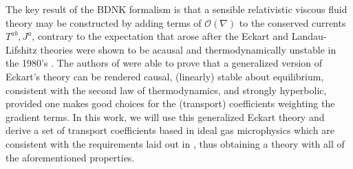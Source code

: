 \documentclass[%
notitlepage,
superscriptaddress,
nofootinbib,
amsmath,
amssymb,
aps,
twocolumn
]{revtex4-1}
\begin{document}
The key result of the BDNK formalism is that a sensible relativistic viscous fluid theory may be constructed by adding terms of $\mathcal{O}(\nabla)$ to the conserved currents $T^{ab}, J^{a}$, contrary to the expectation that arose after the Eckart and Landau-Lifshitz theories were shown to be acausal and thermodynamically unstable in the 1980's \cite{Hiscock_1983,Hiscock_1985}.  The authors of \cite{Bemfica:2020zjp} were able to prove that a generalized version of Eckart's theory can be rendered causal, (linearly) stable about equilibrium, consistent with the second law of thermodynamics, and strongly hyperbolic, provided one makes good choices for the (transport) coefficients weighting the gradient terms.  In this work, we will use this generalized Eckart theory and derive a set of transport coefficients based in ideal gas microphysics which are consistent with the requirements laid out in \cite{Bemfica:2020zjp}, thus obtaining a theory with all of the aforementioned properties.
\end{document}
